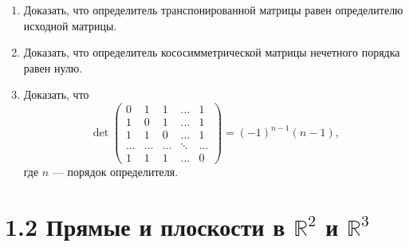 \begin{enumerate}
		\item Доказать, что определитель транспонированной матрицы равен определителю исходной матрицы.

		\item Доказать, что определитель кососимметрической матрицы нечетного порядка равен нулю.

		\item Доказать, что
		\[ 
			\det
			\begin{pmatrix} 
				0 & 1 & 1 & \dots & 1 \\
				1 & 0 & 1 & \dots & 1 \\
				1 & 1 & 0 & \dots & 1 \\
				\dots & \dots & \dots & \ddots & \dots \\
				1 & 1 & 1 & \dots & 0 
			\end{pmatrix}
			= (-1)^{n-1}(n-1),
		\]
		где $n$ — порядок определителя.
	\end{enumerate}
	\newpage

	\section{1.2 Прямые и плоскости в $\mathbb{R}^2$ и $\mathbb{R}^3$}

